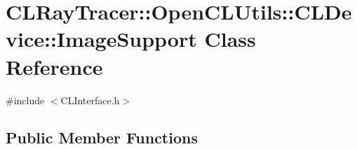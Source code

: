 \hypertarget{class_c_l_ray_tracer_1_1_open_c_l_utils_1_1_c_l_device_1_1_image_support}{}\section{C\+L\+Ray\+Tracer\+:\+:Open\+C\+L\+Utils\+:\+:C\+L\+Device\+:\+:Image\+Support Class Reference}
\label{class_c_l_ray_tracer_1_1_open_c_l_utils_1_1_c_l_device_1_1_image_support}


{\ttfamily \#include $<$C\+L\+Interface.\+h$>$}

\subsection*{Public Member Functions}

